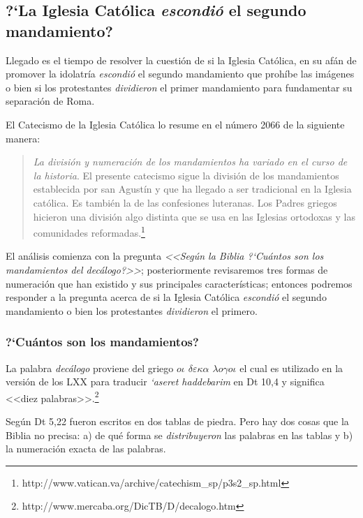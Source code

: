 \documentclass{article}
\begin{document}
\subsection{?`La Iglesia Cat\'olica \emph{escondi\'o} el segundo mandamiento?}

Llegado es el tiempo de resolver la cuesti\'on de si la Iglesia Cat\'olica, en su af\'an de promover la idolatr\'{i}a \emph{escondi\'o} el segundo mandamiento que proh\'{i}be las im\'agenes o bien si los protestantes \emph{dividieron} el primer mandamiento para fundamentar su separaci\'on de Roma.

El Catecismo de la Iglesia Cat\'olica lo resume en el n\'umero 2066 de la siguiente manera:

\begin{quote}
\emph{La división y numeración de los mandamientos ha variado en el curso de la historia}. El presente catecismo sigue la división de los mandamientos establecida por san Agustín y que ha llegado a ser tradicional en la Iglesia católica. Es también la de las confesiones luteranas. Los Padres griegos hicieron una división algo distinta que se usa en las Iglesias ortodoxas y las comunidades reformadas.\footnote{http://www.vatican.va/archive/catechism\_sp/p3s2\_sp.html}
\end{quote}

\noindent
El an\'alisis comienza con la pregunta \emph{<<Seg\'un la Biblia ?`Cu\'antos son los mandamientos del dec\'alogo?>>}; posteriormente revisaremos tres formas de numeraci\'on que han existido y sus principales caracter\'{i}sticas; entonces podremos responder a la pregunta acerca de si la Iglesia Cat\'olica \emph{escondi\'o} el segundo mandamiento o bien los protestantes \emph{dividieron} el primero.

\subsubsection{?`Cu\'antos son los mandamientos?}

La palabra \emph{dec\'alogo} proviene del griego \emph{$o \iota$ $ \delta\varepsilon\kappa\alpha$ $\lambda o \gamma o \iota$} el cual es utilizado en la versi\'on de los LXX para traducir \emph{{\lq}aseret haddebarim} en Dt 10,4 y significa <<diez palabras>>.\footnote{http://www.mercaba.org/DicTB/D/decalogo.htm}

Seg\'un Dt 5,22 fueron escritos en dos tablas de piedra. Pero hay dos cosas que la Biblia no precisa: a) de qu\'e forma se \emph{distribuyeron} las palabras en las tablas y b) la numeraci\'on exacta de las palabras.
\end{document}
